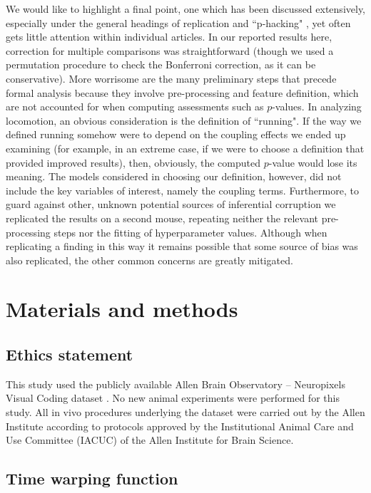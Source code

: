 \documentclass[12pt]{article}
\begin{document}
We would like to highlight a final point, one which has been discussed extensively, especially under the general headings of replication and ``p-hacking" \cite{NAS2019,stefan2023}, yet often gets little attention within individual articles. In our reported results here, correction for multiple comparisons was straightforward (though we used a permutation procedure to check the Bonferroni correction, as it can be conservative). More worrisome are the many preliminary steps that precede formal analysis because they involve pre-processing and feature definition, which are not accounted for when computing assessments such as $p$-values. In analyzing locomotion, an obvious consideration is the definition of ``running". If the way we defined running somehow were to depend on the coupling effects we ended up examining (for example, in an extreme case, if we were to choose a definition that provided improved results), then, obviously, the computed $p$-value would lose its meaning. The models considered in choosing our definition, however, did not include the key variables of interest, namely the coupling terms. Furthermore, to guard against other, unknown potential sources of inferential corruption we replicated the results on a second mouse, repeating neither the relevant pre-processing steps nor the fitting of hyperparameter values. Although when replicating a finding in this way it remains possible that some source of bias was also replicated, the other common concerns are greatly mitigated.


\section{Materials and methods}

\subsection*{Ethics statement}
This study used the publicly available Allen Brain Observatory -- Neuropixels Visual Coding dataset \cite{allendata}. No new animal experiments were performed for this study. All in vivo procedures underlying the dataset were carried out by the Allen Institute according to protocols approved by the Institutional Animal Care and Use Committee (IACUC) of the Allen Institute for Brain Science.

\subsection{Time warping function}
\label{sec:Time warping function}
\end{document}
